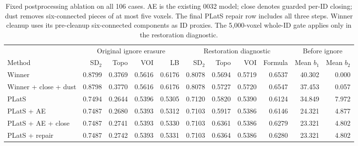 \begin{table}[t]
\centering
\scriptsize
\setlength{\tabcolsep}{3pt}
\begin{tabular}{lrrrrrrrrrr}
\toprule
 & \multicolumn{4}{c}{Original ignore erasure} & \multicolumn{4}{c}{Restoration diagnostic} & \multicolumn{2}{c}{Before ignore} \\
Method & SD$_2$ & Topo & VOI & LB & SD$_2$ & Topo & VOI & Formula & Mean $b_1$ & Mean $b_2$ \\
\midrule
Winner & 0.8799 & 0.3769 & 0.5616 & 0.6176 & 0.8078 & 0.5694 & 0.5719 & 0.6537 & 40.302 & 0.000 \\
Winner + close + dust & 0.8798 & 0.3770 & 0.5616 & 0.6176 & 0.8078 & 0.5727 & 0.5720 & 0.6547 & 37.453 & 0.057 \\
PLatS & 0.7494 & 0.2644 & 0.5396 & 0.5305 & 0.7120 & 0.5820 & 0.5390 & 0.6124 & 34.849 & 7.972 \\
PLatS + AE & 0.7487 & 0.2680 & 0.5393 & 0.5312 & 0.7103 & 0.5917 & 0.5386 & 0.6146 & 24.321 & 4.877 \\
PLatS + AE + close & 0.7487 & 0.2741 & 0.5393 & 0.5330 & 0.7103 & 0.6361 & 0.5386 & 0.6279 & 23.321 & 4.802 \\
PLatS + repair & 0.7487 & 0.2742 & 0.5393 & 0.5331 & 0.7103 & 0.6364 & 0.5386 & 0.6280 & 23.321 & 4.802 \\
\bottomrule
\end{tabular}
\caption{Fixed postprocessing ablation on all 106 cases. AE is the existing 0032 model; close denotes guarded per-ID closing; dust removes six-connected pieces of at most five voxels. The final PLatS repair row includes all three steps. Winner cleanup uses its pre-cleanup six-connected components as ID proxies. The 5,000-voxel whole-ID gate applies only in the restoration diagnostic.}
\label{tab:postprocessing}
\end{table}
